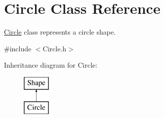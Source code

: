 \hypertarget{class_circle}{}\section{Circle Class Reference}
\label{class_circle}


\mbox{\hyperlink{class_circle}{Circle}} class represents a circle shape.  




{\ttfamily \#include $<$Circle.\+h$>$}

Inheritance diagram for Circle\+:\begin{figure}[H]
\begin{center}
\leavevmode
\includegraphics[height=2.000000cm]{class_circle}
\end{center}
\end{figure}
